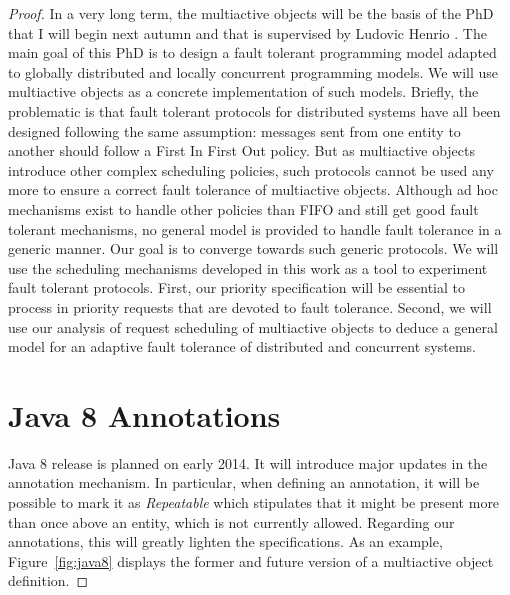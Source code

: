 \documentclass[11pt]{report}
\begin{document}
\begin{proof}
In a very long term, the multiactive objects will be the basis of the PhD that I will begin next autumn and that is supervised by Ludovic Henrio \cite{ref:these}. The main goal of this PhD is to design a fault tolerant programming model adapted to globally distributed and locally concurrent programming models. We will use multiactive objects as a concrete implementation of such models. Briefly, the problematic is that fault tolerant protocols for distributed systems have all been designed following the same assumption: messages sent from one entity to another should follow a First In First Out policy. But as multiactive objects introduce other complex scheduling policies, such protocols cannot be used any more to ensure a correct fault tolerance of multiactive objects. Although ad hoc mechanisms exist to handle other policies than FIFO and still get good fault tolerant mechanisms, no general model is provided to handle fault tolerance in a generic manner. Our goal is to converge towards such generic protocols. We will use the scheduling mechanisms developed in this work as a tool to experiment fault tolerant protocols. First, our priority specification will be essential to process in priority requests that are devoted to fault tolerance. Second, we will use our analysis of request scheduling of multiactive objects to deduce a general model for an adaptive fault tolerance of distributed and concurrent systems.





\appendix
\chapter{Java 8 Annotations}

Java 8 release is planned on early 2014. It will introduce major updates in the annotation mechanism. In particular, when defining an annotation, it will be possible to mark it as \emph{Repeatable} which stipulates that it might be present more than once above an entity, which is not currently allowed. Regarding our annotations, this will greatly lighten the specifications. As an example, Figure~\ref{fig:java8} displays the former and future version of a multiactive object definition.


\end{proof}
\end{document}
